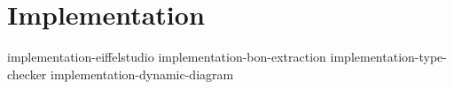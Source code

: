 \chapter{Implementation}
{implementation-eiffelstudio}
{implementation-bon-extraction}
{implementation-type-checker}
{implementation-dynamic-diagram}
